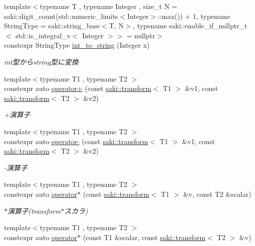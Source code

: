 \begin{DoxyCompactItemize}
\item 
{\footnotesize template$<$typename T , typename Integer , size\+\_\+t N = saki\+::digit\+\_\+count(std\+::numeric\+\_\+limits$<$\+Integer$>$\+::max()) + 1, typename String\+Type  = saki\+::string\+\_\+base$<$\+T, N$>$, typename saki\+::enable\+\_\+if\+\_\+nullptr\+\_\+t$<$ std\+::is\+\_\+integral\+\_\+v$<$ Integer $>$$>$  = nullptr$>$ }\\constexpr String\+Type \mbox{\hyperlink{namespacesaki_a52a09941a80893dfdea6da4c220fba08}{int\+\_\+to\+\_\+string}} (Integer x)
\begin{DoxyCompactList}\small\item\em int型からstring型に変換 \end{DoxyCompactList}\item 
{\footnotesize template$<$typename T1 , typename T2 $>$ }\\constexpr auto \mbox{\hyperlink{namespacesaki_a8f643bf5bc8002b1fefb916ff9c1d56a}{operator+}} (const \mbox{\hyperlink{classsaki_1_1transform}{saki\+::transform}}$<$ T1 $>$ \&v1, const \mbox{\hyperlink{classsaki_1_1transform}{saki\+::transform}}$<$ T2 $>$ \&v2)
\begin{DoxyCompactList}\small\item\em +演算子 \end{DoxyCompactList}\item 
{\footnotesize template$<$typename T1 , typename T2 $>$ }\\constexpr auto \mbox{\hyperlink{namespacesaki_a1a8b351ef2a4ccd991bc774540619b3a}{operator-\/}} (const \mbox{\hyperlink{classsaki_1_1transform}{saki\+::transform}}$<$ T1 $>$ \&v1, const \mbox{\hyperlink{classsaki_1_1transform}{saki\+::transform}}$<$ T2 $>$ \&v2)
\begin{DoxyCompactList}\small\item\em -\/演算子 \end{DoxyCompactList}\item 
{\footnotesize template$<$typename T1 , typename T2 $>$ }\\constexpr auto \mbox{\hyperlink{namespacesaki_ab9612151e27555ea59013c6a7da3322d}{operator$\ast$}} (const \mbox{\hyperlink{classsaki_1_1transform}{saki\+::transform}}$<$ T1 $>$ \&v, const T2 \&scalar)
\begin{DoxyCompactList}\small\item\em $\ast$演算子(transform$\ast$スカラ) \end{DoxyCompactList}\item 
{\footnotesize template$<$typename T1 , typename T2 $>$ }\\constexpr auto \mbox{\hyperlink{namespacesaki_a9f06bb4644df2b78c5032c0656472d4c}{operator$\ast$}} (const T1 \&scalar, const \mbox{\hyperlink{classsaki_1_1transform}{saki\+::transform}}$<$ T2 $>$ \&v)

\end{DoxyCompactItemize}
